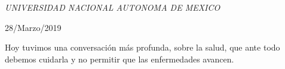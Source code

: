 \documentclass[a4paper, 11pt, oneside]{article}
\begin{document}
\begin{titlepage}
	\textit{UNIVERSIDAD NACIONAL AUTONOMA DE MEXICO} 
	
	\vfill
	
	
	
	
	\vspace{0.3\baselineskip} 
	
	28/Marzo/2019 
	
	

\end{titlepage}
Hoy tuvimos una conversación más profunda, sobre la salud, que ante todo debemos cuidarla y no permitir que las enfermedades avancen.
\end{document}
